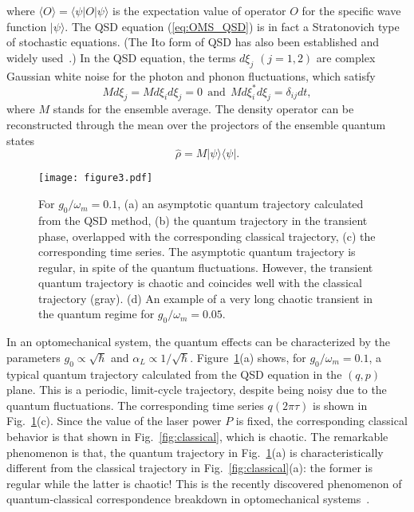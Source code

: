 \documentclass[12pt]{wlscirep}
\begin{document}
where $\langle O\rangle=\langle\psi|O|\psi\rangle$ is the expectation value 
of operator $O$ for the specific wave function $|\psi\rangle$. 
The QSD equation (\ref{eq:OMS_QSD}) is in fact a Stratonovich type of 
stochastic equations. (The Ito form of QSD has also been established 
and widely used~\cite{GP:1992,GP:1993a,GP:1993b,B:2000,BPS:1996}.) 
In the QSD equation, the terms $d\xi_j$ $(j=1,2)$ are complex 
Gaussian white noise for the photon and phonon fluctuations, which satisfy 
\begin{equation*}
Md\xi_j=Md\xi_id\xi_j=0 \ \ \mbox{and} \ \ Md\xi_i^*d\xi_j=\delta_{ij}dt,
\end{equation*}
where $M$ stands for the ensemble average. The density operator can be 
reconstructed through the mean over the projectors of the ensemble 
quantum states 
\begin{equation} \label{eq.rho}
\hat{\rho}=M|\psi\rangle\langle\psi|.
\end{equation}

\begin{figure}
\centering
\texttt{[image: figure3.pdf]}
\caption{For $g_0/\omega_m=0.1$, (a) an asymptotic quantum
trajectory calculated from the QSD method, (b) the quantum trajectory in the
transient phase, overlapped with the corresponding classical trajectory,
(c) the corresponding time series. The asymptotic quantum trajectory is
regular, in spite of the quantum fluctuations. However, the transient
quantum trajectory is chaotic and coincides well with the classical
trajectory (gray). (d) An example of a very long chaotic transient in
the quantum regime for $g_0/\omega_m=0.05$.}
\label{fig:quantum_1}
\end{figure}

In an optomechanical system, the quantum effects can be characterized by 
the parameters $g_0\propto\sqrt{\hbar}$ and $\alpha_L\propto 1/\sqrt{\hbar}$. 
Figure~\ref{fig:quantum_1}(a) shows, for $g_0/\omega_m = 0.1$, a typical 
quantum trajectory calculated from the QSD equation in the $(q,p)$ plane. 
This is a periodic, limit-cycle trajectory, despite being noisy due to 
the quantum fluctuations. The corresponding time series $q(2\pi\tau)$ 
is shown in Fig.~\ref{fig:quantum_1}(c). Since the value of
the laser power $P$ is fixed, the corresponding classical behavior is 
that shown in Fig.~\ref{fig:classical}, which is chaotic. The remarkable
phenomenon is that, the quantum trajectory in Fig.~\ref{fig:quantum_1}(a)
is characteristically different from the classical trajectory in 
Fig.~\ref{fig:classical}(a): the former is regular while the latter is 
chaotic! This is the recently discovered phenomenon of quantum-classical 
correspondence breakdown in optomechanical systems~\cite{BAF:2015}. 
\end{document}

